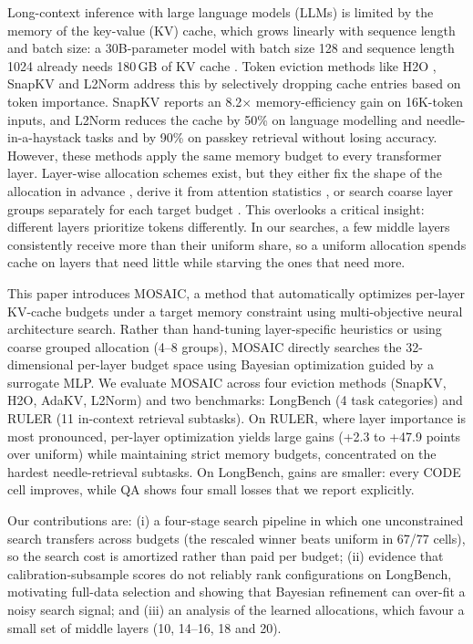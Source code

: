 \documentclass[11pt]{article}
\begin{document}
Long-context inference with large language models (LLMs) is limited by the memory of the key-value (KV) cache, which grows linearly with sequence length and batch size: a 30B-parameter model with batch size 128 and sequence length 1024 already needs 180\,GB of KV cache \citep{zhang2023h2o}. Token eviction methods like H2O \citep{zhang2023h2o}, SnapKV \citep{li2024snapkv} and L2Norm \citep{devoto2024l2norm} address this by selectively dropping cache entries based on token importance. SnapKV reports an 8.2$\times$ memory-efficiency gain on 16K-token inputs, and L2Norm reduces the cache by 50\% on language modelling and needle-in-a-haystack tasks and by 90\% on passkey retrieval without losing accuracy. However, these methods apply the same memory budget to every transformer layer. Layer-wise allocation schemes exist, but they either fix the shape of the allocation in advance \citep{cai2025pyramidkv}, derive it from attention statistics \citep{qin2025cake}, or search coarse layer groups separately for each target budget \citep{yu2025evolkv}. This overlooks a critical insight: different layers prioritize tokens differently. In our searches, a few middle layers consistently receive more than their uniform share, so a uniform allocation spends cache on layers that need little while starving the ones that need more.

This paper introduces MOSAIC, a method that automatically optimizes per-layer KV-cache budgets under a target memory constraint using multi-objective neural architecture search. Rather than hand-tuning layer-specific heuristics or using coarse grouped allocation (4–8 groups), MOSAIC directly searches the 32-dimensional per-layer budget space using Bayesian optimization guided by a surrogate MLP. We evaluate MOSAIC across four eviction methods (SnapKV, H2O, AdaKV, L2Norm) and two benchmarks: LongBench (4 task categories) and RULER (11 in-context retrieval subtasks). On RULER, where layer importance is most pronounced, per-layer optimization yields large gains (+2.3 to +47.9 points over uniform) while maintaining strict memory budgets, concentrated on the hardest needle-retrieval subtasks. On LongBench, gains are smaller: every CODE cell improves, while QA shows four small losses that we report explicitly.

Our contributions are: (i) a four-stage search pipeline in which one unconstrained search transfers across budgets (the rescaled winner beats uniform in 67/77 cells), so the search cost is amortized rather than paid per budget; (ii) evidence that calibration-subsample scores do not reliably rank configurations on LongBench, motivating full-data selection and showing that Bayesian refinement can over-fit a noisy search signal; and (iii) an analysis of the learned allocations, which favour a small set of middle layers (10, 14--16, 18 and 20).
\end{document}
